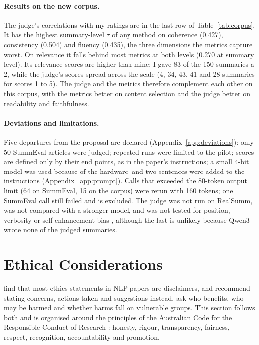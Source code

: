 \documentclass[11pt]{article}
\begin{document}
\paragraph{Results on the new corpus.}
The judge's correlations with my ratings are in the last row of Table~\ref{tab:corpus}. It has the highest summary-level $\tau$ of any method on coherence (0.427), consistency (0.504) and fluency (0.435), the three dimensions the metrics capture worst. On relevance it falls behind most metrics at both levels (0.270 at summary level). Its relevance scores are higher than mine: I gave 83 of the 150 summaries a 2, while the judge's scores spread across the scale (4, 34, 43, 41 and 28 summaries for scores 1 to 5). The judge and the metrics therefore complement each other on this corpus, with the metrics better on content selection and the judge better on readability and faithfulness.

\paragraph{Deviations and limitations.}
Five departures from the proposal are declared (Appendix~\ref{app:deviations}): only 50 SummEval articles were judged; repeated runs were limited to the pilot; scores are defined only by their end points, as in the paper's instructions; a small 4-bit model was used because of the hardware; and two sentences were added to the instructions (Appendix~\ref{app:prompt}). Calls that exceeded the 80-token output limit (64 on SummEval, 15 on the corpus) were rerun with 160 tokens; one SummEval call still failed and is excluded. The judge was not run on RealSumm, was not compared with a stronger model, and was not tested for position, verbosity or self-enhancement bias \citep{zheng-etal-2023-judging}, although the last is unlikely because Qwen3 wrote none of the judged summaries.

\section{Ethical Considerations}
\label{sec:ethics}

\citet{karamolegkou-etal-2025-ethical} find that most ethics statements in NLP papers are disclaimers, and recommend stating concerns, actions taken and suggestions instead. \citet{benotti-blackburn-2022-ethics} ask who benefits, who may be harmed and whether harms fall on vulnerable groups. This section follows both and is organised around the principles of the Australian Code for the Responsible Conduct of Research \citep{nhmrc-2018-code}: honesty, rigour, transparency, fairness, respect, recognition, accountability and promotion.
\end{document}
